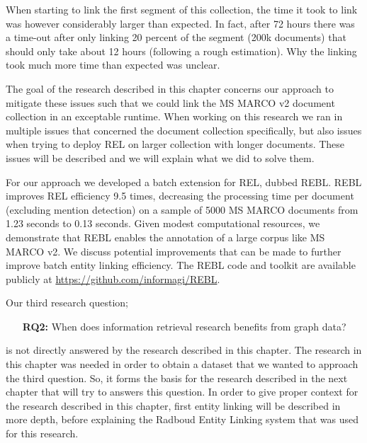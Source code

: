 When starting to link the first segment of this collection, the time it took to link was however considerably larger than expected. In fact, after 72 hours there was a time-out after only linking 20 percent of the segment (200k documents) that should only take about 12 hours (following a rough estimation). Why the linking took much more time than expected was unclear. 

The goal of the research described in this chapter concerns our approach to mitigate these issues such that we could link the MS MARCO v2 document collection in an exceptable runtime. When working on this research we ran in multiple issues that concerned the document collection specifically, but also issues when trying to deploy REL on larger collection with longer documents. These issues will be described and we will explain what we did to solve them. 

For our approach we developed a batch extension for REL, dubbed REBL. REBL improves REL efficiency 9.5 times, decreasing the processing time per document (excluding mention detection) on a sample of 5000 MS MARCO documents from 1.23 seconds to 0.13 seconds. Given modest computational resources, we demonstrate that REBL enables the annotation of a large corpus like MS MARCO v2. We discuss potential improvements that can be made to further improve batch entity linking efficiency. The REBL code and toolkit are available publicly at \url{https://github.com/informagi/REBL}.

Our third research question; 
\begin{itemize}
	\item[\textbf{RQ2:}] When does information retrieval research benefits from graph data?
\end{itemize} 
is not directly answered by the research described in this chapter. The research in this chapter was needed in order to obtain a dataset that we wanted to approach the third question. So, it forms the basis for the research described in the next chapter that will try to answers this question. In order to give proper context for the research described in this chapter, first entity linking will be described in more depth, before explaining the Radboud Entity Linking system that was used for this research. 

